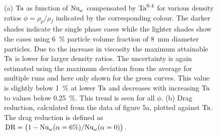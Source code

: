 \begin{figure}
\centering
{}
\caption{
(a) $\text{Ta}$ as function of $\text{Nu}_\omega$ compensated by $\text{Ta}^{0.4}$ for
various density ratios $\phi=\rho_p/\rho_f$ indicated by the corresponding
colour. The darker shades indicate the single phase cases while the
lighter shades show the cases using \SI{6}{\percent} particle volume
fraction of \SI{8}{\milli\metre} diameter particles. Due to the increase
in viscosity the maximum attainable $\text{Ta}$ is lower for larger density
ratios. The uncertainty is again estimated using the maximum
deviation from the average for multiple runs and here only shown for
the green curves. This value is slightly below \SI{1}{\percent} at
lower $\text{Ta}$ and decreases with increasing $\text{Ta}$ to values below
\SI{0.25}{\percent}. This trend is seen for all $\phi$.  (b) 
Drag reduction, calculated from the data of figure 5a, plotted against
$\text{Ta}$. The drag reduction is defined as $\text{DR} = \left(1 -
\text{Nu}_\omega(\alpha=6\%) / \text{Nu}_\omega(\alpha=0) \right)$.
}
\label{fig:dragReductionDen}
\end{figure}
\newpage
